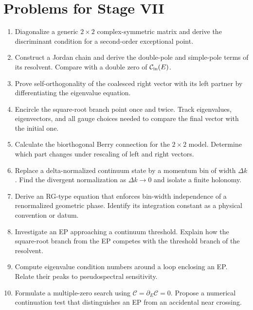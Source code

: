 \section{Problems for Stage VII}
\label{problems:stage-VII}

\begin{enumerate}[label=\textbf{VII.\arabic*},leftmargin=*]
  \item Diagonalize a generic $2\times2$ complex-symmetric matrix and derive
  the discriminant condition for a second-order exceptional point.

  \item Construct a Jordan chain and derive the double-pole and simple-pole
  terms of its resolvent.  Compare with a double zero of
  $\mathcal{C}_{\mathrm{in}}(E)$.

  \item Prove self-orthogonality of the coalesced right vector with its left
  partner by differentiating the eigenvalue equation.

  \item Encircle the square-root branch point once and twice.  Track
  eigenvalues, eigenvectors, and all gauge choices needed to compare the final
  vector with the initial one.

  \item Calculate the biorthogonal Berry connection for the $2\times2$ model.
  Determine which part changes under rescaling of left and right vectors.

  \item Replace a delta-normalized continuum state by a momentum bin of width
  $\Delta k$.  Find the divergent normalization as $\Delta k\to0$ and isolate
  a finite holonomy.

  \item Derive an RG-type equation that enforces bin-width independence of a
  renormalized geometric phase.  Identify its integration constant as a
  physical convention or datum.

  \item Investigate an EP approaching a continuum threshold.  Explain how the
  square-root branch from the EP competes with the threshold branch of the
  resolvent.

  \item Compute eigenvalue condition numbers around a loop enclosing an EP.
  Relate their peaks to pseudospectral sensitivity.

  \item Formulate a multiple-zero search using
  $\mathcal C=\partial_E\mathcal C=0$.  Propose a numerical continuation test
  that distinguishes an EP from an accidental near crossing.
\end{enumerate}
